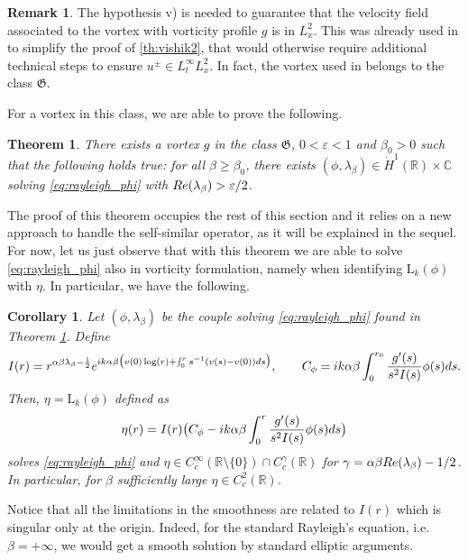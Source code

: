 \documentclass[11pt,reqno]{amsproc}
\def\dd{{\rm d}}
\def\eps{\varepsilon}
\def\e{{\rm e}}
\def\RR {\mathbb{R}}
\def\Re{{\rm Re}}
\newcommand{\rmL}{\mathrm{L}}
\newtheorem{theorem}[proposition]{Theorem}
\newtheorem{corollary}[proposition]{Corollary}
\theoremstyle{definition}
\newtheorem{remark}[proposition]{Remark}
\theoremstyle{definition}
\numberwithin{equation}{section}
\begin{document}
\begin{remark}
    The hypothesis v) is needed to guarantee that the velocity field associated to the vortex with vorticity profile $g$ is in $L^2_x$. This was already used in \cite{castro2024proof} to simplify the proof of \cref{th:vishik2}, that would otherwise require additional technical steps to ensure $u^{\pm}\in L^\infty_tL^2_x$. In fact, the vortex used in \cite{castro2024proof} belongs to the class $\mathfrak{G}.$
\end{remark}
\noindent 
For a vortex in this class, we are able to prove the following.
\begin{theorem}
\label{th:phiH1}
    There exists a vortex $g$ in the class $\mathfrak{G}$, $0<\eps<1$  and $\beta_0>0$ such that the following holds true: for all $\beta\geq \beta_0$, there exists $(\phi,\lambda_\beta)\in \dot{H}^1(\RR)\times \mathbb{C} $ solving \cref{eq:rayleigh_phi} with $\Re(\lambda_\beta)>\eps/2$.
\end{theorem}
The proof of this theorem occupies the rest of this section and it relies on a new approach to handle the self-similar operator, as it will be explained in the sequel. For now, let us just observe that with this theorem we are able to solve \cref{eq:rayleigh_phi} also in vorticity formulation, namely when identifying $\rmL_k(\phi)$ with $\eta$. In particular, we have the following.
\begin{corollary}
\label{cor:eta}
Let $(\phi,\lambda_\beta)$ be the couple solving \cref{eq:rayleigh_phi} found in Theorem \ref{th:phiH1}. Define 
\begin{equation}
\label{def:IC}
I(r)=r^{\alpha\beta\lambda_\beta-\frac12}\e^{ik\alpha \beta \big(v(0)\log(r)+\int_0^rs^{-1}(v(s)-v(0))\dd s\big)}, \qquad  C_\phi=ik\alpha\beta \int_0^{r_0}\frac{g'(s)}{s^2I(s)} \phi(s)\dd s.
\end{equation}
Then, $\eta=\rmL_k(\phi)$ defined as 
\begin{equation}
\label{def:eta}
\eta(r)=I(r)\big(C_\phi-ik\alpha\beta \int_0^r\frac{g'(s)}{s^2I(s)} \phi(s)\dd s\big)
 \end{equation}
solves \cref{eq:rayleigh_phi} and $\eta\in C^\infty_c(\RR\setminus \{0\})\cap C^\gamma_c(\RR)$ for $\gamma=\alpha \beta\Re(\lambda_\beta)-1/2$. In particular, for $\beta$ sufficiently large $\eta\in C^2_c(\RR)$.
\end{corollary}
Notice that all the limitations in the smoothness are related to $I(r)$ which is singular only at the origin. Indeed, for the standard Rayleigh's equation, i.e. $\beta=+\infty$, we would get a smooth solution by standard elliptic arguments. 
\end{document}
